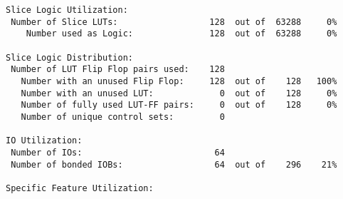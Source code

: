 \begin{verbatim}
Slice Logic Utilization: 
 Number of Slice LUTs:                  128  out of  63288     0%
    Number used as Logic:               128  out of  63288     0%

Slice Logic Distribution: 
 Number of LUT Flip Flop pairs used:    128
   Number with an unused Flip Flop:     128  out of    128   100%
   Number with an unused LUT:             0  out of    128     0%
   Number of fully used LUT-FF pairs:     0  out of    128     0%
   Number of unique control sets:         0

IO Utilization: 
 Number of IOs:                          64
 Number of bonded IOBs:                  64  out of    296    21%

Specific Feature Utilization:
\end{verbatim}
